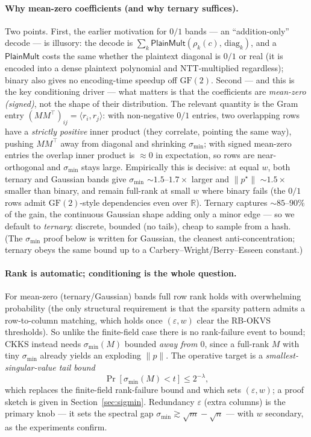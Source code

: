 \documentclass[11pt]{article}
\newcommand{\norm}[1]{\lVert #1 \rVert}
\newcommand{\sigmin}{\sigma_{\min}}
\theoremstyle{plain}
\theoremstyle{definition}
\begin{document}
\paragraph{Why mean-zero coefficients (and why ternary suffices).}
Two points. First, the earlier motivation for $0/1$ bands --- an ``addition-only'' decode ---
is illusory: the decode is $\sum_k \mathsf{PlainMult}(\rho_k(c),\,\mathrm{diag}_k)$, and a
$\mathsf{PlainMult}$ costs the same whether the plaintext diagonal is $0/1$ or real (it is
encoded into a dense plaintext polynomial and NTT-multiplied regardless); binary also gives no
encoding-time speedup off $\mathrm{GF}(2)$. Second --- and this is the key conditioning
driver --- what matters is that the coefficients are \emph{mean-zero (signed)}, not the shape
of their distribution. The relevant quantity is the Gram entry $(MM^\top)_{ij}=\langle
r_i,r_j\rangle$: with non-negative $0/1$ entries, two overlapping rows have a \emph{strictly
positive} inner product (they correlate, pointing the same way), pushing $MM^\top$ away from
diagonal and shrinking $\sigmin$; with signed mean-zero entries the overlap inner product is
$\approx 0$ in expectation, so rows are near-orthogonal and $\sigmin$ stays large. Empirically
this is decisive: at equal $w$, both ternary and Gaussian bands give $\sigmin$ $\sim\!1.5$--$1.7\times$
larger and $\norm{p^\star}$ $\sim\!1.5\times$ smaller than binary, and remain full-rank at small
$w$ where binary fails (the $0/1$ rows admit $\mathrm{GF}(2)$-style dependencies even over
$\mathbb{R}$). Ternary captures $\sim\!85$--$90\%$ of the gain, the continuous Gaussian shape
adding only a minor edge --- so we default to \emph{ternary}: discrete, bounded (no tails),
cheap to sample from a hash. (The $\sigmin$ proof below is written for Gaussian, the cleanest
anti-concentration; ternary obeys the same bound up to a Carbery--Wright/Berry--Esseen
constant.)

\paragraph{Rank is automatic; conditioning is the whole question.}
For mean-zero (ternary/Gaussian) bands full row rank holds with overwhelming probability (the
only structural requirement is that
the sparsity pattern admits a row-to-column matching, which holds once $(\varepsilon,w)$
clear the RB-OKVS thresholds). So unlike the finite-field case there is no rank-failure event
to bound; CKKS instead needs $\sigmin(M)$ bounded \emph{away from $0$}, since a full-rank $M$
with tiny $\sigmin$ already yields an exploding $\norm{p}$. The operative target is a
\emph{smallest-singular-value tail bound}
\[
  \Pr[\sigmin(M)<t]\le 2^{-\lambda},
\]
which replaces the finite-field rank-failure bound and which sets $(\varepsilon,w)$; a proof
sketch is given in Section~\ref{sec:sigmin}. Redundancy $\varepsilon$ (extra columns) is the
primary knob --- it sets the spectral gap $\sigmin\gtrsim\sqrt m-\sqrt n$ --- with $w$
secondary, as the experiments confirm.
\end{document}
